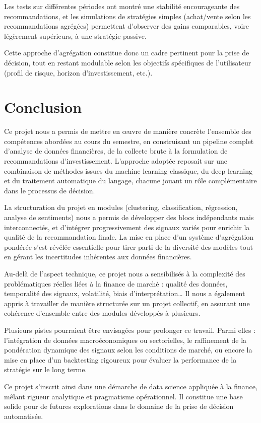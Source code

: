 \documentclass[a4paper,12pt]{article}
\begin{document}
Les tests sur différentes périodes ont montré une stabilité encourageante des recommandations, et les simulations de stratégies simples (achat/vente selon les recommandations agrégées) permettent d’observer des gains comparables, voire légèrement supérieurs, à une stratégie passive.

Cette approche d’agrégation constitue donc un cadre pertinent pour la prise de décision, tout en restant modulable selon les objectifs spécifiques de l’utilisateur (profil de risque, horizon d’investissement, etc.).

\section{Conclusion}

Ce projet nous a permis de mettre en œuvre de manière concrète l’ensemble des compétences abordées au cours du semestre, en construisant un pipeline complet d’analyse de données financières, de la collecte brute à la formulation de recommandations d’investissement. L’approche adoptée reposait sur une combinaison de méthodes issues du machine learning classique, du deep learning et du traitement automatique du langage, chacune jouant un rôle complémentaire dans le processus de décision.

La structuration du projet en modules (clustering, classification, régression, analyse de sentiments) nous a permis de développer des blocs indépendants mais interconnectés, et d’intégrer progressivement des signaux variés pour enrichir la qualité de la recommandation finale. La mise en place d’un système d’agrégation pondérée s’est révélée essentielle pour tirer parti de la diversité des modèles tout en gérant les incertitudes inhérentes aux données financières.

Au-delà de l’aspect technique, ce projet nous a sensibilisés à la complexité des problématiques réelles liées à la finance de marché : qualité des données, temporalité des signaux, volatilité, biais d’interprétation… Il nous a également appris à travailler de manière structurée sur un projet collectif, en assurant une cohérence d’ensemble entre des modules développés à plusieurs.

Plusieurs pistes pourraient être envisagées pour prolonger ce travail. Parmi elles : l’intégration de données macroéconomiques ou sectorielles, le raffinement de la pondération dynamique des signaux selon les conditions de marché, ou encore la mise en place d’un backtesting rigoureux pour évaluer la performance de la stratégie sur le long terme.

Ce projet s’inscrit ainsi dans une démarche de data science appliquée à la finance, mêlant rigueur analytique et pragmatisme opérationnel. Il constitue une base solide pour de futures explorations dans le domaine de la prise de décision automatisée.
\end{document}
